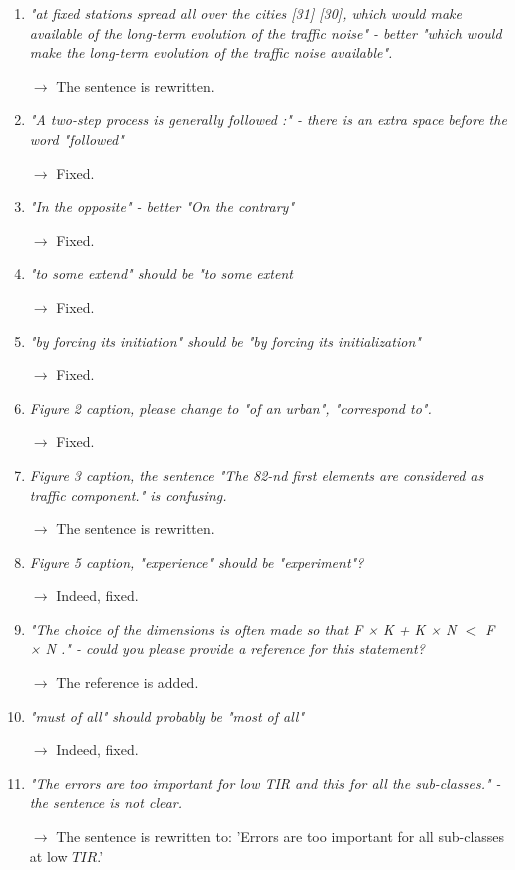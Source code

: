 \documentclass[10pt]{article}
\begin{document}
\begin{enumerate}
\item \emph{"at fixed stations spread all over the cities [31] [30], which would make available of the long-term evolution of the traffic noise" - better "which would make the long-term evolution of the traffic noise available".}

$\rightarrow$ The sentence is rewritten.

\item \emph{"A two-step process is generally followed :" - there is an extra space before the word "followed" }

$\rightarrow$ Fixed.

\item \emph{"In the opposite" - better "On the contrary"}

$\rightarrow$ Fixed.

\item \emph{"to some extend" should be "to some extent}

$\rightarrow$ Fixed.

\item \emph{"by forcing its initiation" should be "by forcing its initialization"}

$\rightarrow$ Fixed.

\item \emph{Figure 2 caption, please change to "of an urban", "correspond to".}

$\rightarrow$ Fixed.

\item \emph{Figure 3 caption, the sentence "The 82-nd first elements are considered as traffic component." is confusing.}

$\rightarrow$ The sentence is rewritten.

\item \emph{Figure 5 caption, "experience" should be "experiment"?}

$\rightarrow$ Indeed, fixed.

\item \emph{"The choice of the dimensions is often made so that F × K + K × N $<$ F × N ." - could you please provide a reference for this statement? }

$\rightarrow$ The reference \cite{fevotte_nonnegative_2009} is added.

\item \emph{"must of all" should probably be "most of all" }

$\rightarrow$ Indeed, fixed.

\item \emph{"The errors are too important for low TIR and this for all the sub-classes." - the sentence is not clear.}

$\rightarrow$ The sentence is rewritten to: 'Errors are too important for all sub-classes at low $TIR$.'

\end{enumerate}


\end{document}
